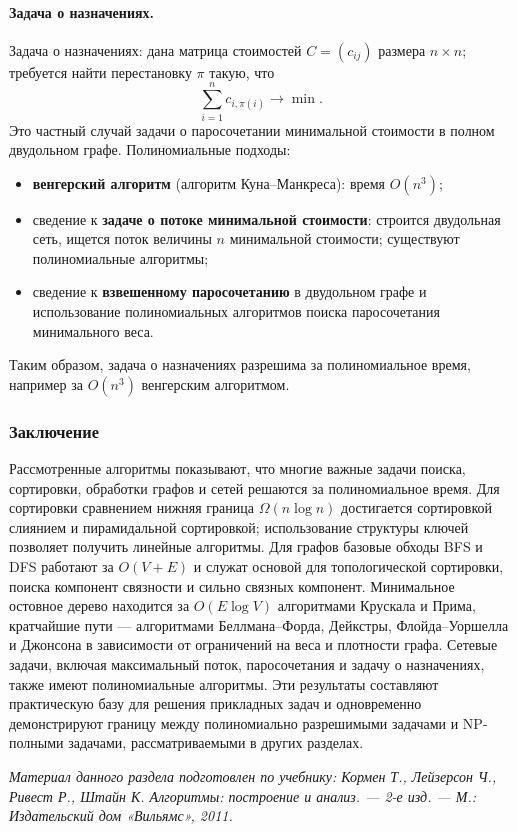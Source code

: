 \documentclass[a4paper,12pt]{article}
\begin{document}
\paragraph*{Задача о назначениях.}
Задача о назначениях: дана матрица стоимостей \(C=(c_{ij})\) размера \(n\times n\); требуется найти перестановку \(\pi\) такую, что
\[
\sum_{i=1}^{n} c_{i,\pi(i)}\to\min.
\]
Это частный случай задачи о паросочетании минимальной стоимости в полном двудольном графе. Полиномиальные подходы:
\begin{itemize}
    \item \textbf{венгерский алгоритм} (алгоритм Куна--Манкреса): время \(O(n^3)\);
    \item сведение к \textbf{задаче о потоке минимальной стоимости}: строится двудольная сеть, ищется поток величины \(n\) минимальной стоимости; существуют полиномиальные алгоритмы;
    \item сведение к \textbf{взвешенному паросочетанию} в двудольном графе и использование полиномиальных алгоритмов поиска паросочетания минимального веса.
\end{itemize}
Таким образом, задача о назначениях разрешима за полиномиальное время, например за \(O(n^3)\) венгерским алгоритмом.

\subsubsection*{Заключение}
Рассмотренные алгоритмы показывают, что многие важные задачи поиска, сортировки, обработки графов и сетей решаются за полиномиальное время. Для сортировки сравнением нижняя граница \(\Omega(n\log n)\) достигается сортировкой слиянием и пирамидальной сортировкой; использование структуры ключей позволяет получить линейные алгоритмы. Для графов базовые обходы BFS и DFS работают за \(O(V+E)\) и служат основой для топологической сортировки, поиска компонент связности и сильно связных компонент. Минимальное остовное дерево находится за \(O(E\log V)\) алгоритмами Крускала и Прима, кратчайшие пути — алгоритмами Беллмана--Форда, Дейкстры, Флойда--Уоршелла и Джонсона в зависимости от ограничений на веса и плотности графа. Сетевые задачи, включая максимальный поток, паросочетания и задачу о назначениях, также имеют полиномиальные алгоритмы. Эти результаты составляют практическую базу для решения прикладных задач и одновременно демонстрируют границу между полиномиально разрешимыми задачами и NP-полными задачами, рассматриваемыми в других разделах.

\noindent\textit{Материал данного раздела подготовлен по учебнику: Кормен Т., Лейзерсон Ч., Ривест Р., Штайн К. Алгоритмы: построение и анализ. — 2-е изд. — М.: Издательский дом «Вильямс», 2011.}
\medskip
\end{document}
